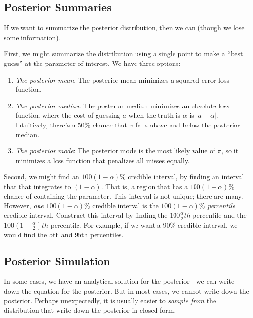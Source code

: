 \documentclass[
]{book}
\providecommand{\tightlist}{%
  \setlength{\itemsep}{0pt}\setlength{\parskip}{0pt}}
\begin{document}
\hypertarget{posterior-summaries}{%
\subsection{Posterior Summaries}\label{posterior-summaries}}

If we want to summarize the posterior distribution, then we can (though
we lose some information).

First, we might summarize the distribution using a single point to make
a ``best guess'' at the parameter of interest. We have three options:

\begin{enumerate}
\def\labelenumi{\arabic{enumi}.}
\tightlist
\item
  \emph{The posterior mean}. The posterior mean minimizes a
  squared-error loss function.
\item
  \emph{The posterior median}: The posterior median minimizes an
  absolute loss function where the cost of guessing \(a\) when the truth
  is \(\alpha\) is \(|a - \alpha|\). Intuitively, there's a 50\% chance
  that \(\pi\) falls above and below the posterior median.
\item
  \emph{The posterior mode}: The posterior mode is the most likely value
  of \(\pi\), so it minimizes a loss function that penalizes all misses
  equally.
\end{enumerate}

Second, we might find an \(100(1 - \alpha)\%\) credible interval, by
finding an interval that that integrates to \((1 - \alpha)\). That is, a
region that has a \(100(1 - \alpha)\%\) chance of containing the
parameter. This interval is not unique; there are many. However,
\emph{one} \(100(1 - \alpha)\%\) credible interval is the
\(100(1 - \alpha)\%\) \emph{percentile} credible interval. Construct
this interval by finding the \(100\frac{\alpha}{2}th\) percentile and
the \(100(1 - \frac{\alpha}{2})th\) percentile. For example, if we want
a 90\% credible interval, we would find the 5th and 95th percentiles.

\hypertarget{posterior-simulation}{%
\subsection{Posterior Simulation}\label{posterior-simulation}}

In some cases, we have an analytical solution for the posterior---we can
write down the equation for the posterior. But in most cases, we cannot
write down the posterior. Perhaps unexpectedly, it is usually easier to
\emph{sample from} the distribution that write down the posterior in
closed form.
\end{document}

